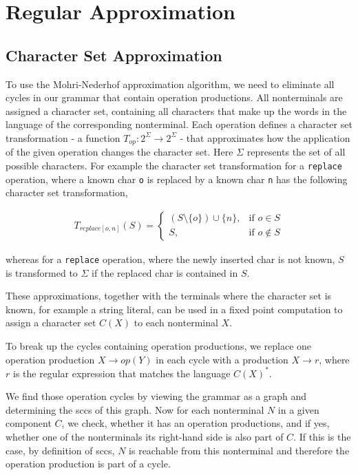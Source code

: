 \section{Regular Approximation}\label{approximation}
\subsection{Character Set Approximation}
To use the Mohri-Nederhof approximation algorithm, we need to eliminate all cycles in our grammar that contain operation productions.
All nonterminals are assigned a character set, containing all characters that make up the words in the language of the corresponding nonterminal. Each operation defines a character set transformation - a function $T_{op} : 2^\Sigma \rightarrow 2^\Sigma$ - that approximates how the application of the given operation changes the character set. Here $\Sigma$ represents the set of all possible characters.
For example the character set transformation for a \lstinline|replace| operation, where a known char \lstinline|o| is replaced by a known char \lstinline|n| has the following character set transformation,

\begin{align}
	T_{replace[o, n]}(S) = 
	\begin{cases}
		(S \setminus \{o\}) \cup \{n\}, & \text{if } o \in S\\
		S, & \text{if } o \notin S
	\end{cases}
\end{align}

whereas for a \lstinline|replace| operation, where the newly inserted char is not known, $S$ is transformed to $\Sigma$ if the replaced char is contained in $S$.

These approximations, together with the terminals where the character set is known, for example a string literal, can be used in a fixed point computation to assign a character set $C(X)$ to each nonterminal $X$.

To break up the cycles containing operation productions, we replace one operation production $X \rightarrow op(Y)$ in each cycle with a production $X \rightarrow r$, where $r$ is the regular expression that matches the language $C(X)^*$.

We find those operation cycles by viewing the grammar as a graph and determining the \acp{scc} of this graph. Now for each nonterminal $N$ in a given component $C$, we check, whether it has an operation productions, and if yes, whether one of the nonterminals its right-hand side is also part of $C$. If this is the case, by definition of \acp{scc}, $N$ is reachable from this nonterminal and therefore the operation production is part of a cycle.

